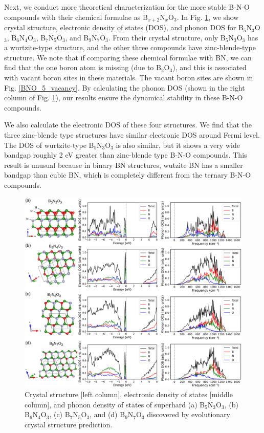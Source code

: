     Next, we conduct more theoretical characterization for the more stable B-N-O compounds with their chemical formulae as B$_{x+2}$N$_x$O$_{3}$.
    In Fig. \ref{BNO_4_DFT}, we show crystal structure, electronic density of states (DOS), and phonon DOS for B$_5$N$_3$O$_3$, B$_6$N$_4$O$_3$, B$_7$N$_5$O$_3$, and B$_9$N$_7$O$_3$. From their crystal structure, only B$_5$N$_3$O$_3$ has a wurtzite-type structure, and the other three compounds have zinc-blende-type structure. We note that if comparing these chemical formulae with BN, we can find that the one boron atom is missing (due to B$_2$O$_3$), and this is associated with vacant boron sites in these materials. The vacant boron sites are shown in Fig. \ref{BNO_5_vacancy}. By calculating the phonon DOS (shown in the right column of Fig. \ref{BNO_4_DFT}), our results ensure the dynamical stability in these B-N-O compounds.
    
    We also calculate the electronic DOS of these four structures. We find that the three zinc-blende type structures have similar electronic DOS around Fermi level. The DOS of wurtzite-type B$_5$N$_3$O$_3$ is also similar, but it shows a very wide bandgap roughly 2 eV greater than zinc-blende type B-N-O compounds. This result is unusual because in binary BN structures, wutzite BN has a smaller bandgap than cubic BN, which is completely different from the ternary B-N-O compounds.

	\begin{figure}[htbp]
        \centering
        \captionsetup{singlelinecheck = false, justification=justified}
        \includegraphics[width=1.0\textwidth]{BNO_4_DFT.png}
        \caption[Crystal structures, electronic density of states, and phonon density of states of superhard B-N-O compounds.]{Crystal structure [left column], electronic density of states [middle column], and phonon density of states of superhard (a) B$_5$N$_3$O$_3$, (b) B$_6$N$_4$O$_3$, (c) B$_7$N$_5$O$_3$, and (d) B$_9$N$_7$O$_3$ discovered by evolutionary crystal structure prediction. }
        \label{BNO_4_DFT}
    \end{figure}
    \pagebreak
    
